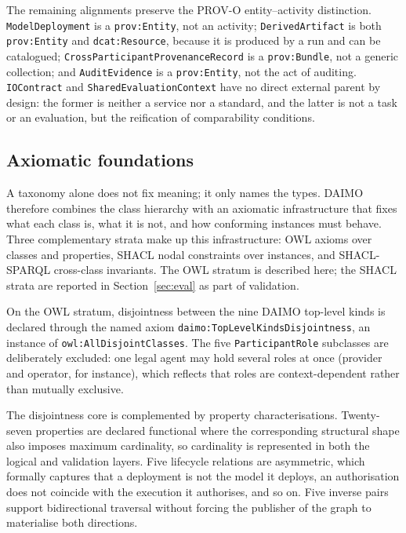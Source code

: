 \documentclass[Afour,sagev,times]{sagej}
\newcommand{\code}[1]{\texttt{#1}}
\begin{document}
The remaining alignments preserve the PROV-O entity--activity distinction. \code{ModelDeployment} is a \code{prov:Entity}, not an activity; \code{DerivedArtifact} is both \code{prov:Entity} and \code{dcat:Resource}, because it is produced by a run and can be catalogued; \code{CrossParticipantProvenanceRecord} is a \code{prov:Bundle}, not a generic collection; and \code{AuditEvidence} is a \code{prov:Entity}, not the act of auditing. \code{IOContract} and \code{SharedEvaluationContext} have no direct external parent by design: the former is neither a service nor a standard, and the latter is not a task or an evaluation, but the reification of comparability conditions.


\subsection{Axiomatic foundations}\label{sec:axiomatic}

A taxonomy alone does not fix meaning; it only names the types. DAIMO therefore combines the class hierarchy with an axiomatic infrastructure that fixes what each class is, what it is not, and how conforming instances must behave. Three complementary strata make up this infrastructure: OWL axioms over classes and properties, SHACL nodal constraints over instances, and SHACL-SPARQL cross-class invariants. The OWL stratum is described here; the SHACL strata are reported in Section~\ref{sec:eval} as part of validation.

On the OWL stratum, disjointness between the nine DAIMO top-level kinds is declared through the named axiom \code{daimo:TopLevelKindsDisjointness}, an instance of \code{owl:AllDisjointClasses}. The five \code{ParticipantRole} subclasses are deliberately excluded: one legal agent may hold several roles at once (provider and operator, for instance), which reflects that roles are context-dependent rather than mutually exclusive.

The disjointness core is complemented by property characterisations. Twenty-seven properties are declared functional where the corresponding structural shape also imposes maximum cardinality, so cardinality is represented in both the logical and validation layers. Five lifecycle relations are asymmetric, which formally captures that a deployment is not the model it deploys, an authorisation does not coincide with the execution it authorises, and so on. Five inverse pairs support bidirectional traversal without forcing the publisher of the graph to materialise both directions.
\end{document}
